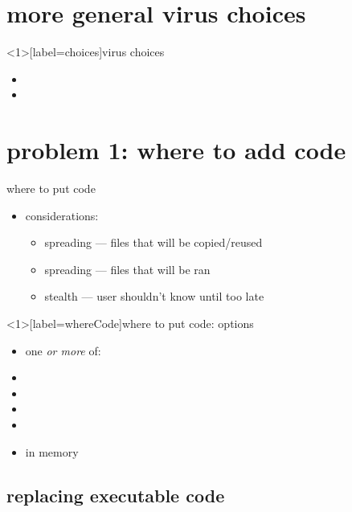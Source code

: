\section{more general virus choices}

\begin{frame}<1>[label=choices]{virus choices}
    \begin{itemize}
    \item {}
    \item {}
    \end{itemize}
\end{frame}

\section{problem 1: where to add code}


\begin{frame}{where to put code}
    \begin{itemize}
    \item considerations:
        \begin{itemize}
        \item spreading --- files that will be copied/reused
        \item spreading --- files that will be ran
        \item stealth --- user shouldn't know until too late
        \end{itemize}
    \end{itemize}
\end{frame}

\begin{frame}<1>[label=whereCode]{where to put code: options}
    \begin{itemize}
    \item one \textit{or more} of:
    \item {}
    \item {}
    \item {}
    \item {}
    \item in memory
    \end{itemize}
\end{frame}

\subsection{replacing executable code}

